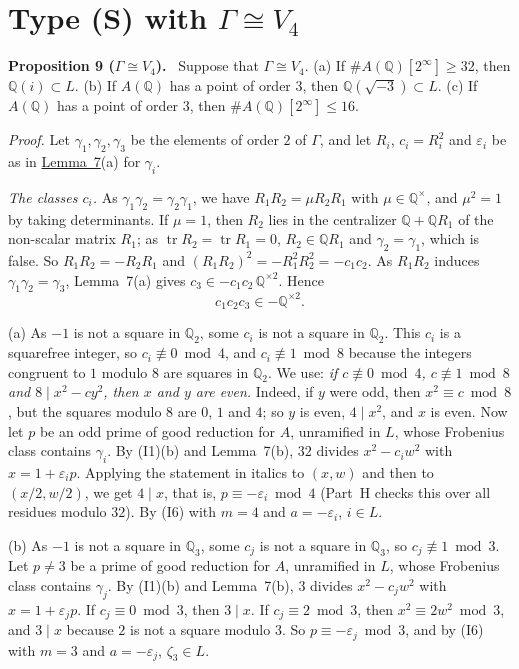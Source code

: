 \documentclass[11pt]{article}
\newenvironment{statement}[1]{\par\medskip\noindent\phantomsection\textbf{#1}\ }{\par\medskip}
\newcommand{\Q}{\mathbb Q}
\DeclareMathOperator{\tr}{tr}
\begin{document}
\section{Type (S) with \(\Gamma\cong V_4\)}\label{v4}

\begin{statement}{Proposition 9 (\(\Gamma\cong V_4\)).}\label{prop-v4}
Suppose that \(\Gamma\cong V_4\).
(a) If \(\#A(\Q)[2^\infty]\ge32\), then \(\Q(i)\subset L\).
(b) If \(A(\Q)\) has a point of order \(3\), then \(\Q(\sqrt{-3})\subset L\).
(c) If \(A(\Q)\) has a point of order \(3\), then \(\#A(\Q)[2^\infty]\le16\).
\end{statement}

\emph{Proof.} Let \(\gamma_1,\gamma_2,\gamma_3\) be the elements of order \(2\) of \(\Gamma\), and let \(R_i\),
\(c_i=R_i^2\) and \(\varepsilon_i\) be as in \hyperref[lemma-inv]{Lemma~7}(a) for \(\gamma_i\).

\emph{The classes \(c_i\).} As \(\gamma_1\gamma_2=\gamma_2\gamma_1\), we have \(R_1R_2=\mu R_2R_1\) with
\(\mu\in\Q^\times\), and \(\mu^2=1\) by taking determinants. If \(\mu=1\), then \(R_2\) lies in the centralizer
\(\Q+\Q R_1\) of the non-scalar matrix \(R_1\); as \(\tr R_2=\tr R_1=0\), \(R_2\in\Q R_1\) and
\(\gamma_2=\gamma_1\), which is false. So \(R_1R_2=-R_2R_1\) and \((R_1R_2)^2=-R_1^2R_2^2=-c_1c_2\). As \(R_1R_2\)
induces \(\gamma_1\gamma_2=\gamma_3\), Lemma~7(a) gives \(c_3\in-c_1c_2\,\Q^{\times2}\). Hence
\[c_1c_2c_3\in-\Q^{\times2}.\]

(a) As \(-1\) is not a square in \(\Q_2\), some \(c_i\) is not a square in \(\Q_2\). This \(c_i\) is a
squarefree integer, so \(c_i\not\equiv0\bmod4\), and \(c_i\not\equiv1\bmod8\) because the integers congruent to
\(1\) modulo \(8\) are squares in \(\Q_2\). We use: \emph{if \(c\not\equiv0\bmod4\), \(c\not\equiv1\bmod8\) and
\(8\mid x^2-cy^2\), then \(x\) and \(y\) are even.} Indeed, if \(y\) were odd, then \(x^2\equiv c\bmod8\), but the
squares modulo \(8\) are \(0\), \(1\) and \(4\); so \(y\) is even, \(4\mid x^2\), and \(x\) is even. Now let \(p\)
be an odd prime of good reduction for \(A\), unramified in \(L\), whose Frobenius class contains \(\gamma_i\). By
(I1)(b) and Lemma~7(b), \(32\) divides \(x^2-c_iw^2\) with \(x=1+\varepsilon_ip\). Applying the statement in italics to
\((x,w)\) and then to \((x/2,w/2)\), we get \(4\mid x\), that is, \(p\equiv-\varepsilon_i\bmod4\) (Part~H checks this over
all residues modulo \(32\)). By (I6) with \(m=4\) and \(a=-\varepsilon_i\), \(i\in L\).

(b) As \(-1\) is not a square in \(\Q_3\), some \(c_j\) is not a square in \(\Q_3\), so \(c_j\not\equiv1\bmod3\).
Let \(p\neq3\) be a prime of good reduction for \(A\), unramified in \(L\), whose Frobenius class contains
\(\gamma_j\). By (I1)(b) and Lemma~7(b), \(3\) divides \(x^2-c_jw^2\) with \(x=1+\varepsilon_jp\). If \(c_j\equiv0\bmod3\),
then \(3\mid x\). If \(c_j\equiv2\bmod3\), then \(x^2\equiv2w^2\bmod3\), and \(3\mid x\) because \(2\) is not a
square modulo \(3\). So \(p\equiv-\varepsilon_j\bmod3\), and by (I6) with \(m=3\) and \(a=-\varepsilon_j\), \(\zeta_3\in L\).
\end{document}
